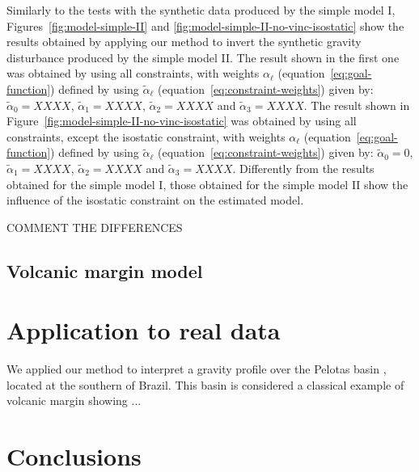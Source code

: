 \documentclass[manuscript]{geophysics}
\begin{document}
Similarly to the tests with the synthetic data produced by the simple model I, 
Figures~\ref{fig:model-simple-II} and \ref{fig:model-simple-II-no-vinc-isostatic}
show the results obtained by applying our method to invert the synthetic gravity 
disturbance produced by the simple model II.
The result shown in the first one was obtained by using all constraints,
with weights $\alpha_{\ell}$ (equation~\ref{eq:goal-function}) defined by
using $\tilde{\alpha}_{\ell}$ (equation~\ref{eq:constraint-weights}) given by: 
$\tilde{\alpha}_{0} = XXXX$, $\tilde{\alpha}_{1} = XXXX$, 
$\tilde{\alpha}_{2} = XXXX$ and $\tilde{\alpha}_{3} = XXXX$.
The result shown in Figure~\ref{fig:model-simple-II-no-vinc-isostatic} was
obtained by using all constraints, except the isostatic constraint, 
with weights $\alpha_{\ell}$ (equation~\ref{eq:goal-function}) defined by
using $\tilde{\alpha}_{\ell}$ (equation~\ref{eq:constraint-weights}) given by: 
$\tilde{\alpha}_{0} = 0$, $\tilde{\alpha}_{1} = XXXX$, 
$\tilde{\alpha}_{2} = XXXX$ and $\tilde{\alpha}_{3} = XXXX$.
Differently from the results obtained for the simple model I, those obtained
for the simple model II show the influence of the isostatic constraint on
the estimated model.

COMMENT THE DIFFERENCES





\subsection*{Volcanic margin model}




\section{Application to real data}

We applied our method to interpret a gravity profile over the Pelotas basin
\citep{stica-etal2014}, located at the southern of Brazil. This basin is considered
a classical example of volcanic margin \citep{geoffroy2005} showing ...


\section{Conclusions}

\lipsum[1-3]

\end{document}
